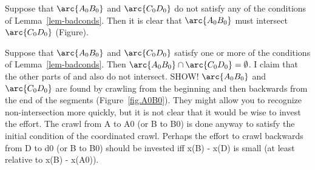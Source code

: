 Suppose that $\arc{A_{0}B_{0}}$ and $\arc{C_{0}D_{0}}$ do not satisfy any of the 
conditions of Lemma~\ref{lem-badconds}.
Then it is clear that $\arc{A_{0}B_{0}}$ must intersect
$\arc{C_{0}D_{0}}$ (Figure).
%
%

Suppose that $\arc{A_{0}B_{0}}$ and $\arc{C_{0}D_{0}}$ satisfy one or more of the 
conditions of Lemma~\ref{lem-badconds}.
Then $\arc{A_{0}B_{0}} \cap \arc{C_{0}D_{0}} = \emptyset$.
I claim that the other parts of  and  also do not intersect.
SHOW!
\QED
%
$\arc{A_{0}B_{0}}$ and $\arc{C_{0}D_{0}}$ are found by crawling from the
beginning and then backwards from the end of the segments (Figure~\ref{fig.A0B0}).
They might allow you to recognize non-intersection more quickly, 
but it is not clear that it would be wise to invest the effort.
The crawl from A to A0 (or B to B0) is  done anyway to satisfy 
the initial condition of the coordinated crawl.
Perhaps  the effort to crawl backwards from D to d0 (or B to B0)
should be invested iff x(B) - x(D) is small (at least relative to
x(B) - x(A0)).

